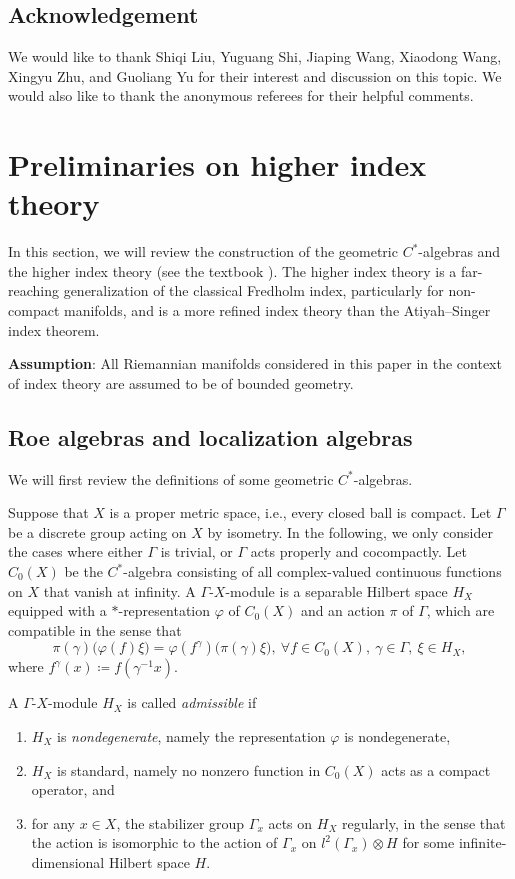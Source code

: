 \documentclass[12pt, reqno]{amsart}
\theoremstyle{plain}%
\theoremstyle{definition}
\theoremstyle{remark}
\numberwithin{equation}{section}
\begin{document}
\subsection*{Acknowledgement} We would like to thank Shiqi Liu, Yuguang Shi, Jiaping Wang, Xiaodong Wang, Xingyu Zhu, and Guoliang Yu for their interest and discussion on this topic. We would also like to thank the anonymous referees for their helpful comments.


\section{Preliminaries on higher index theory}\label{sec:pre}
In this section, we will review the construction of the geometric $C^*$-algebras and the higher index theory (see the textbook \cite{willett2020higher}). The higher index theory \cites{BaumConnesHigson,MR0996437,Roe} is a far-reaching generalization of the classical Fredholm index, particularly for non-compact manifolds, and is a more refined index theory than the Atiyah--Singer index theorem.

\textbf{Assumption}: All Riemannian manifolds considered in this paper in the context of index theory are assumed to be of bounded geometry.


\subsection{Roe algebras and localization algebras}\label{subsec:Roealgebra}
We will first review the definitions of some geometric $C^*$-algebras. 

Suppose that  $X$ is a proper metric space, i.e., every closed ball is compact. Let $\Gamma$ be a discrete group acting on $X$ by isometry. In the following, we only consider the cases where either $\Gamma$ is trivial, or $\Gamma$ acts properly and cocompactly.
Let $C_0(X)$ be the $C^*$-algebra consisting of all complex-valued continuous functions on $X$ that vanish at infinity. A $\Gamma$-$X$-module is a separable Hilbert space $H_X$ equipped with a $*$-representation $\varphi$ of $C_0(X)$ and an action $\pi$ of $\Gamma$, which are compatible in the sense that
$$\pi(\gamma)\big(\varphi(f)\xi\big)=\varphi(f^\gamma)\big(\pi(\gamma)\xi\big),~\forall f\in C_0(X),~\gamma\in\Gamma,~\xi\in H_X,$$
where $f^\gamma(x)\coloneqq f(\gamma^{-1}x)$.

A $\Gamma$-$X$-module $H_X$ is called \emph{admissible} if
\begin{enumerate}
	\item $H_X$ is \emph{nondegenerate}, namely the representation $\varphi$ is nondegenerate,
	\item $H_X$ is standard, namely no nonzero function in $C_0(X)$ acts as a compact operator, and
	\item for any $x\in X$, the stabilizer group $\Gamma_x$ acts on $H_X$ regularly, in the sense that the action is isomorphic to the action of $\Gamma_x$ on $l^2(\Gamma_x)\otimes H$ for some infinite-dimensional Hilbert space $H$.
\end{enumerate}
\end{document}
